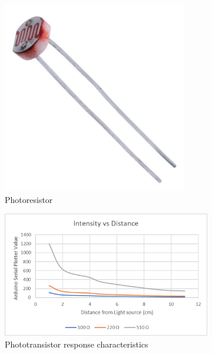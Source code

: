 \begin{figure}
    \centering
    \begin{subfigure}[b]{.2\linewidth}
        \includegraphics[width=\linewidth]{images/photoresistor.png}
        \caption{Photoresistor}
    \end{subfigure}
    \hspace{2cm}
    \begin{subfigure}[b]{.4\linewidth}
        \includegraphics[width=\linewidth]{images/ldr-graph.png}
        \caption{Phototransistor response characteristics}
    \end{subfigure}
    \caption{}
\end{figure}


